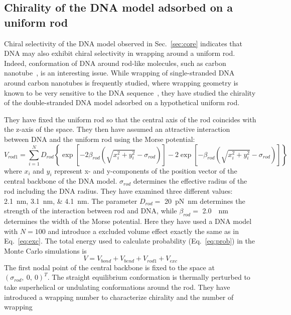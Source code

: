 \documentclass[a4paper,10pt]{article}
\begin{document}
\subsection{Chirality of the DNA model adsorbed on a uniform rod}\label{sec:rod}
Chiral selectivity of the DNA model observed in Sec.~\ref{sec:core} indicates that DNA may also exhibit chiral selectivity in wrapping around a uniform rod.
Indeed, conformation of DNA around rod-like molecules, such as carbon nanotube~\cite{rod_2}, is an interesting issue.
While wrapping of single-stranded DNA around carbon nanotubes is frequently studied, where wrapping geometry is known to be very sensitive to the DNA sequence~\cite{rod_1}, they have studied the chirality of the double-stranded DNA model adsorbed on a hypothetical uniform rod.

They have fixed the uniform rod so that the central axis of the rod coincides with the z-axis of the space.
They then have assumed an attractive interaction between DNA and the uniform rod using the Morse potential:
\begin{equation}\label{eq:rod_1}
V_{rod 1}=\sum_{i=1}^{N}D_{rod}\left\{\exp\left[-2\beta_{rod}\left(\sqrt{x_{i}^{2}+y_{i}^{2}}-\sigma_{rod}\right)\right]-2\exp\left[-\beta_{rod}\left(\sqrt{x_{i}^{2}+y_{i}^{2}}-\sigma_{rod}\right)\right]\right\}
\end{equation}
where $x_{i}$ and $y_{i}$ represent x- and y-components of the position vector of the central backbone of the DNA model.
$\sigma_{rod}$ determines the effective radius of the rod including the DNA radius.
They have examined three different values: \SIlist{2.1;3.1;4.1}{\nm}.
The parameter $D_{rod}=$ \SI{20}{\pico\newton\nano\meter} determines the strength of the interaction between rod and DNA, while $\beta_{rod}=$ \SI{2.0}{\per\nm} determines the width of the Morse potential.
Here they have used a DNA model with $N=100$ and introduce a excluded volume effect exactly the same as in Eq.~\ref{eq:exc}.
The total energy used to calculate probability (Eq.~\ref{eq:prob}) in the Monte Carlo simulations is
\begin{equation}\label{eq:rod_1_energy}
V=V_{bond}+V_{bend}+V_{rod 1}+V_{exc}
\end{equation}
The first nodal point of the central backbone is fixed to the space at $\left(\sigma_{rod},\ 0,\ 0\right )^T$.
The straight equilibrium conformation is thermally perturbed to take superhelical or undulating conformations around the rod.
They have introduced a wrapping number to characterize chirality and the number of wrapping
\end{document}
